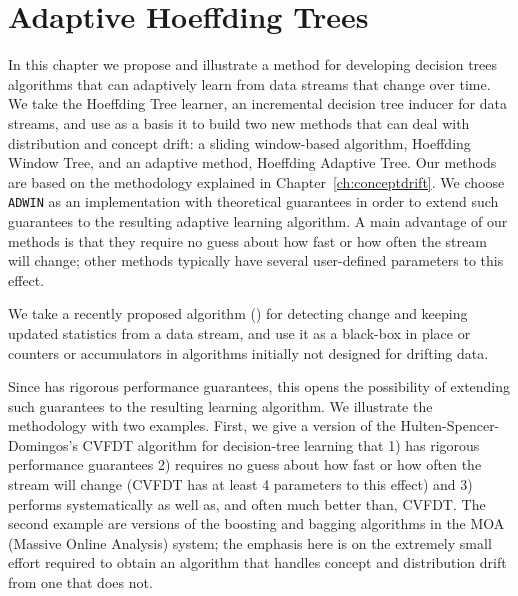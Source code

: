 

\chapter{Adaptive Hoeffding Trees}
\label{ch:decisiontrees}
In this chapter we propose and illustrate a method for developing decision trees algorithms that
can adaptively learn from data streams that change over time.
We take the Hoeffding Tree learner, an incremental decision tree inducer for data streams, 
and use as a basis it to build two new methods that can deal with distribution
and concept drift: a sliding window-based algorithm, Hoeffding Window Tree, 
and an adaptive method, Hoeffding Adaptive Tree.
Our methods are based on the methodology explained in Chapter~\ref{ch:conceptdrift}.
We choose {\tt ADWIN} as an implementation with theoretical guarantees 
in order to extend such guarantees to the resulting adaptive learning
algorithm. A main advantage of our methods is that they require no guess about 
how fast or how often the stream will change; other methods typically have
several user-defined parameters to this effect.


\BEGINOMIT
We take a recently proposed algorithm (\adwinb) for detecting change
and keeping updated statistics from a data stream, and use it as a black-box
in place or counters or accumulators in algorithms initially not designed for drifting
data. 

Since \adwin has rigorous performance guarantees, this
opens the possibility of extending such guarantees to the resulting learning
algorithm. We illustrate the methodology with two examples. First, we
give a version of the Hulten-Spencer-Domingos's CVFDT algorithm
for decision-tree learning that 1) has rigorous performance guarantees
2) requires no guess about how fast or how often the stream will change (CVFDT
has at least 4 parameters to this effect) and 3) performs systematically
as well as, and often much better than, CVFDT. The second example are
versions of the boosting and bagging algorithms in the MOA (Massive Online Analysis) system;
the emphasis here is on the extremely small effort required to obtain 
an algorithm that handles concept and distribution drift from
one that does not.
\ENDOMIT

